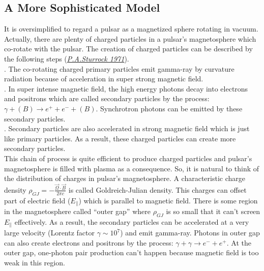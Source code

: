 \documentclass[12pt]{report}
\begin{document}
          
        \subsection{A More Sophisticated Model}
              It is oversimplified to regard a pulsar as a magnetized sphere rotating in vacuum. Actually,
              there are plenty of 
              charged particles in a pulsar's magnetosphere which co-rotate with the pulsar. The creation of 
              charged particles can 
              be described by the following steps 
              (\href{http://articles.adsabs.harvard.edu/cgi-bin/nph-iarticle\_query?1971...164..529S&amp;data
              \_type=PDF\_HIGH&amp;whole\_paper=YES&amp;type=PRINTER&amp;filetype=.pdf}{\textit{P.A.Sturrock
              1971}}). \\ 
              . The co-rotating charged primary particles emit gamma-ray by curvature radiation 
              because of acceleration in super strong magnetic field.  \\
              . In super intense magnetic field,  the high energy photons decay into electrons and 
              positrons which are called secondary particles by the process: 
              $\gamma + (B) \rightarrow e^++e^-+(B)$. Synchrotron 
                                  photons can be emitted by these secondary particles. \\
              . Secondary particles are also accelerated in strong magnetic field which is just like 
              primary particles. As a result, these charged particles can create more secondary particles. \\
              \indent This chain of process is quite efficient to produce charged particles and pulsar's 
              magnetosphere is filled with plasma as a consequence. So, it is natural to think of the 
              distribution of charges in pulsar's magnetosphere. A characteristic charge density 
              $\rho_{GJ}=-\frac{\vec{\Omega}\cdot \vec{B}}{2\pi c}$ is called Goldreich-Julian density. 
              This charges can offset part of electric field ($E_{\parallel}$) which is parallel to magnetic 
              field. There is some region in the magnetosphere called ``outer gap'' where $\rho_{GJ}$ is so 
              small that it can't screen $E_{\parallel}$ effectively. As a result, the secondary particles can 
              be accelerated at a very large velocity (Lorentz factor $\gamma\sim 10^7$) and emit gamma-ray. 
              Photons in outer gap can also create electrons and positrons by the process: 
              $\gamma+\gamma\rightarrow e^-+e^+$. At the outer gap, one-photon pair production can't happen 
              because magnetic field is too weak in this region.
 
\end{document}
